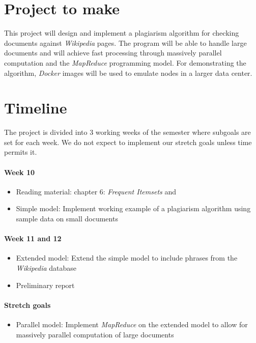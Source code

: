 \section{Project to make}
This project will design and implement a plagiarism algorithm for checking documents against \emph{Wikipedia} pages. The program will be able to handle large documents and will achieve fast processing through massively parallel computation and the \emph{MapReduce} programming model. For demonstrating the algorithm, \emph{Docker} images will be used to emulate nodes in a larger data center.


\section{Timeline}
The project is divided into 3 working weeks of the semester where subgoals are set for each week. We do not expect to implement our stretch goals unless time permits it.

\paragraph{Week 10}
\begin{itemize}
    \item Reading material: \cite{leskovec2014mining} chapter 6: \emph{Frequent Itemsets} and \cite{huang2008similarity}
    \item Simple model: Implement working example of a plagiarism algorithm using sample data on small documents
\end{itemize}

\paragraph{Week 11 and 12}
\begin{itemize}
    \item Extended model: Extend the simple model to include phrases from the \emph{Wikipedia} database
    \item Preliminary report
\end{itemize}

\paragraph{Stretch goals}
\begin{itemize}
    \item Parallel model: Implement \emph{MapReduce} on the extended model to allow for massively parallel computation of large documents
\end{itemize}